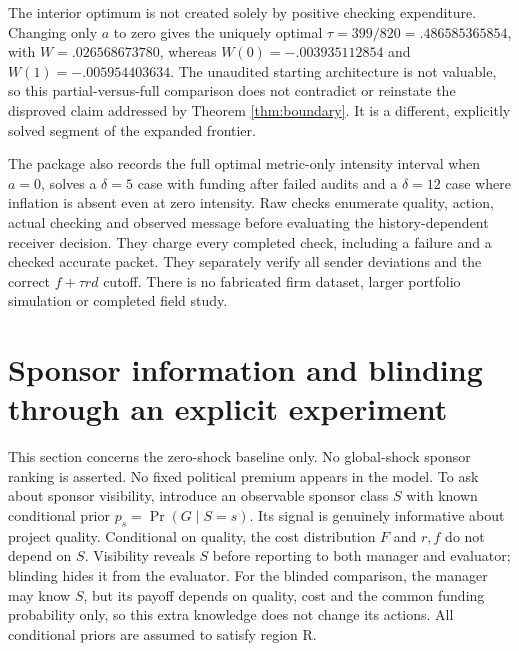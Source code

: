 \documentclass[11pt]{article}
\begin{document}
The interior optimum is not created solely by positive checking expenditure. Changing only $a$ to zero gives the uniquely optimal $\tau=399/820=.486585365854$, with $W=.026568673780$, whereas $W(0)=-.003935112854$ and $W(1)=-.005954403634$. The unaudited starting architecture is not valuable, so this partial-versus-full comparison does not contradict or reinstate the disproved claim addressed by Theorem \ref{thm:boundary}. It is a different, explicitly solved segment of the expanded frontier.

The package also records the full optimal metric-only intensity interval when $a=0$, solves a $\delta=5$ case with funding after failed audits and a $\delta=12$ case where inflation is absent even at zero intensity. Raw checks enumerate quality, action, actual checking and observed message before evaluating the history-dependent receiver decision. They charge every completed check, including a failure and a checked accurate packet. They separately verify all sender deviations and the correct $f+\tau rd$ cutoff. There is no fabricated firm dataset, larger portfolio simulation or completed field study.

\section{Sponsor information and blinding through an explicit experiment}\label{sec:sponsor}
This section concerns the zero-shock baseline only. No global-shock sponsor ranking is asserted. No fixed political premium appears in the model. To ask about sponsor visibility, introduce an observable sponsor class $S$ with known conditional prior $p_s=\Pr(G\mid S=s)$. Its signal is genuinely informative about project quality. Conditional on quality, the cost distribution $F$ and $r,f$ do not depend on $S$. Visibility reveals $S$ before reporting to both manager and evaluator; blinding hides it from the evaluator. For the blinded comparison, the manager may know $S$, but its payoff depends on quality, cost and the common funding probability only, so this extra knowledge does not change its actions. All conditional priors are assumed to satisfy region R.
\end{document}
